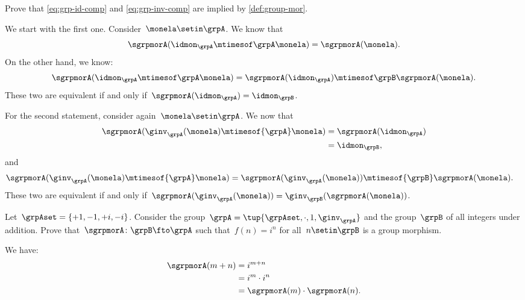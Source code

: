\begin{exercise}
    Prove that \cref{eq:grp-id-comp} and \cref{eq:grp-inv-comp} are implied by \cref{def:group-mor}.
\end{exercise}
\begin{solution}
    We start with the first one.
    Consider~$\monela \setin \grpA$.
    We know that
    \begin{equation*}
        \sgrpmorA(\idmon_\grpA \mtimesof\grpA \monela)=\sgrpmorA(\monela).
    \end{equation*}
    On the other hand, we know:
    \begin{equation*}
        \sgrpmorA(\idmon_\grpA \mtimesof\grpA \monela) = \sgrpmorA(\idmon_\grpA)\mtimesof\grpB \sgrpmorA(\monela).
    \end{equation*}
    These two are equivalent if and only if~$\sgrpmorA(\idmon_\grpA)=\idmon_\grpB$.

    For the second statement, consider again~$\monela \setin \grpA$.
    We now that
    \begin{equation*}
        \begin{aligned}
            \sgrpmorA(\ginv_{\grpA}(\monela)\mtimesof{\grpA} \monela) & =\sgrpmorA(\idmon_\grpA) \\
                                                                      & =\idmon_\grpB,
        \end{aligned}
    \end{equation*}
    and
    \begin{equation*}
        \begin{aligned}
            \sgrpmorA(\ginv_{\grpA}(\monela)\mtimesof{\grpA} \monela) & =\sgrpmorA(\ginv_{\grpA}(\monela))\mtimesof{\grpB} \sgrpmorA(\monela).
        \end{aligned}
    \end{equation*}
    These two are equivalent if and only if~$\sgrpmorA(\ginv_{\grpA}(\monela))=\ginv_{\grpB}(\sgrpmorA(\monela))$.

\end{solution}

\begin{exercise}
    Let~$\grpAset=\{+1,-1,+i,-i\}$.
    Consider the group~$\grpA=\tup{\grpAset, \cdot, 1, \ginv_\grpA}$ and the group~$\grpB$ of all integers under addition.
    Prove that~$\sgrpmorA\colon \grpB \fto \grpA$ such that~$f(n)=i^n$ for all~$n\setin \grpB$ is a group morphism.
\end{exercise}
\begin{solution}
    We have:
    \begin{equation*}
        \begin{aligned}
            \sgrpmorA(m+n) & =i^{m+n} \\
                           & =i^m \cdot i^n \\
                           & =\sgrpmorA(m)\cdot \sgrpmorA(n).
        \end{aligned}
    \end{equation*}
\end{solution}


